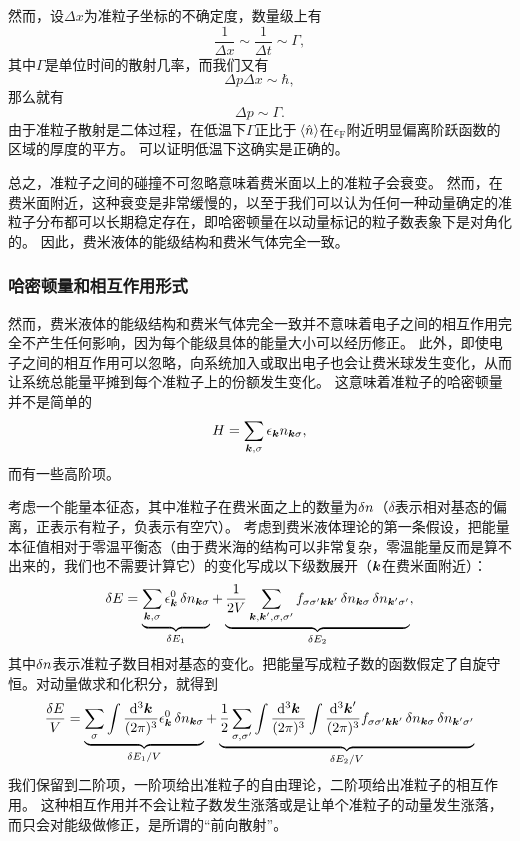 \documentclass[hyperref, UTF8, a4paper]{ctexart}
\begin{document}
然而，设$\Delta x$为准粒子坐标的不确定度，数量级上有
\[
    \frac{1}{\Delta x} \sim \frac{1}{\Delta t} \sim \Gamma,
\]
其中$\Gamma$是单位时间的散射几率，而我们又有
\[
    \Delta p \Delta x \sim \hbar,
\]
那么就有
\[
    \Delta p \sim \Gamma.
\]
由于准粒子散射是二体过程，在低温下$\Gamma$正比于$\expval*{\hat{n}}$在$\epsilon_\text{F}$附近明显偏离阶跃函数的区域的厚度的平方。
可以证明低温下这确实是正确的。

总之，准粒子之间的碰撞不可忽略意味着费米面以上的准粒子会衰变。
然而，在费米面附近，这种衰变是非常缓慢的，以至于我们可以认为任何一种动量确定的准粒子分布都可以长期稳定存在，即哈密顿量在以动量标记的粒子数表象下是对角化的。
因此，费米液体的能级结构和费米气体完全一致。

\subsubsection{哈密顿量和相互作用形式}

然而，费米液体的能级结构和费米气体完全一致并不意味着电子之间的相互作用完全不产生任何影响，因为每个能级具体的能量大小可以经历修正。
此外，即使电子之间的相互作用可以忽略，向系统加入或取出电子也会让费米球发生变化，从而让系统总能量平摊到每个准粒子上的份额发生变化。
这意味着准粒子的哈密顿量并不是简单的
\[
    H = \sum_{\vb*{k}, \sigma} \epsilon_{\vb*{k}} n_{\vb*{k} \sigma},
\]
而有一些高阶项。

考虑一个能量本征态，其中准粒子在费米面之上的数量为$\var{n}$（$\delta$表示相对基态的偏离，正表示有粒子，负表示有空穴）。
考虑到费米液体理论的第一条假设，把能量本征值相对于零温平衡态（由于费米海的结构可以非常复杂，零温能量反而是算不出来的，我们也不需要计算它）的变化写成以下级数展开（$\vb*{k}$在费米面附近）：
\begin{equation}
    \var{E} = \underbrace{\sum_{\vb*{k}, \sigma} \epsilon^0_{\vb*{k}} \var{n_{\vb*{k} \sigma}}}_{\var{E_1}} + \underbrace{\frac{1}{2V} \sum_{\vb*{k}, \vb*{k}', \sigma, \sigma'} f_{\sigma \sigma' \vb*{k} \vb*{k}'} \var{n_{\vb*{k} \sigma}} \var{n_{\vb*{k}' \sigma'}}}_{\var{E_2}},
    \label{eq:fermi-liquid-energy}
\end{equation}
其中$\var{n}$表示准粒子数目相对基态的变化。把能量写成粒子数的函数假定了自旋守恒。对动量做求和化积分，就得到
\begin{equation}
    \frac{\var{E}}{V} = \underbrace{\sum_{\sigma} \int \frac{\dd[3]{\vb*{k}}}{(2\pi)^3} \epsilon^0_{\vb*{k}} \var{n_{\vb*{k} \sigma}}}_{\var{E_1} / V} + \underbrace{\frac{1}{2} \sum_{\sigma, \sigma'} \int \frac{\dd[3]{\vb*{k}}}{(2\pi)^3} \int \frac{\dd[3]{\vb*{k}'}}{(2\pi)^3} f_{\sigma \sigma' \vb*{k} \vb*{k}'} \var{n_{\vb*{k} \sigma}} \var{n_{\vb*{k}' \sigma'}}}_{\var{E_2} / V}
\end{equation}
我们保留到二阶项，一阶项给出准粒子的自由理论，二阶项给出准粒子的相互作用。
这种相互作用并不会让粒子数发生涨落或是让单个准粒子的动量发生涨落，而只会对能级做修正，是所谓的“前向散射”。
\end{document}
